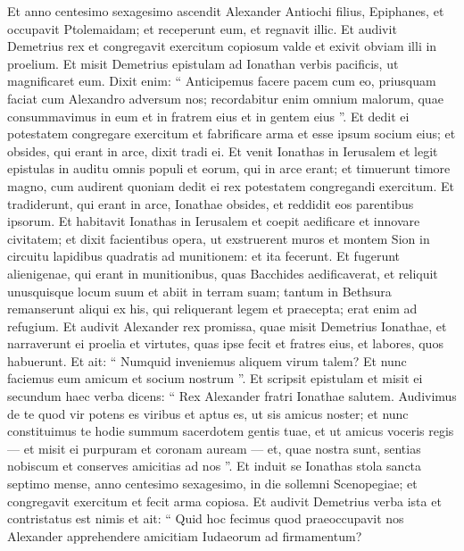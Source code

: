 \begin{biblechapter}
\begin{biblechapter}
\begin{biblechapter}
\begin{biblechapter}
\begin{biblechapter}
\begin{biblechapter}
\begin{biblechapter}
\begin{biblechapter}
\begin{biblechapter}
\begin{biblechapter}
\verse Et anno centesimo sexagesimo ascendit Alexander Antiochi filius, Epiphanes, et occupavit Ptolemaidam; et receperunt eum, et regnavit illic. 
\verse Et audivit Demetrius rex et congregavit exercitum copiosum valde et exivit obviam illi in proelium. 
\verse Et misit Demetrius epistulam ad Ionathan verbis pacificis, ut magnificaret eum. 
\verse Dixit enim: “ Anticipemus facere pacem cum eo, priusquam faciat cum Alexandro adversum nos; 
\verse recordabitur enim omnium malorum, quae consummavimus in eum et in fratrem eius et in gentem eius ”. 
\verse Et dedit ei potestatem congregare exercitum et fabrificare arma et esse ipsum socium eius; et obsides, qui erant in arce, dixit tradi ei. 
\verse Et venit Ionathas in Ierusalem et legit epistulas in auditu omnis populi et eorum, qui in arce erant; 
\verse et timuerunt timore magno, cum audirent quoniam dedit ei rex potestatem congregandi exercitum. 
\verse Et tradiderunt, qui erant in arce, Ionathae obsides, et reddidit eos parentibus ipsorum. 
\verse Et habitavit Ionathas in Ierusalem et coepit aedificare et innovare civitatem; 
\verse et dixit facientibus opera, ut exstruerent muros et montem Sion in circuitu lapidibus quadratis ad munitionem: et ita fecerunt. 
\verse Et fugerunt alienigenae, qui erant in munitionibus, quas Bacchides aedificaverat, 
\verse et reliquit unusquisque locum suum et abiit in terram suam; 
\verse tantum in Bethsura remanserunt aliqui ex his, qui reliquerant legem et praecepta; erat enim ad refugium.
 \verse Et audivit Alexander rex promissa, quae misit Demetrius Ionathae, et narraverunt ei proelia et virtutes, quas ipse fecit et fratres eius, et labores, quos habuerunt. 
\verse Et ait: “ Numquid inveniemus aliquem virum talem? Et nunc faciemus eum amicum et socium nostrum ”. 
\verse Et scripsit epistulam et misit ei secundum haec verba dicens: 
\verse “ Rex Alexander fratri Ionathae salutem. 
 \verse Audivimus de te quod vir potens es viribus et aptus es, ut sis amicus noster; 
 \verse et nunc constituimus te hodie summum sacerdotem gentis tuae, et ut amicus voceris regis — et misit ei purpuram et coronam auream — et, quae nostra sunt, sentias nobiscum et conserves amicitias ad nos ”. 
\verse Et induit se Ionathas stola sancta septimo mense, anno centesimo sexagesimo, in die sollemni Scenopegiae; et congregavit exercitum et fecit arma copiosa.
 \verse Et audivit Demetrius verba ista et contristatus est nimis et ait: 
\verse “ Quid hoc fecimus quod praeoccupavit nos Alexander apprehendere amicitiam Iudaeorum ad firmamentum? 

\end{biblechapter}
\end{biblechapter}
\end{biblechapter}
\end{biblechapter}
\end{biblechapter}
\end{biblechapter}
\end{biblechapter}
\end{biblechapter}
\end{biblechapter}
\end{biblechapter}
